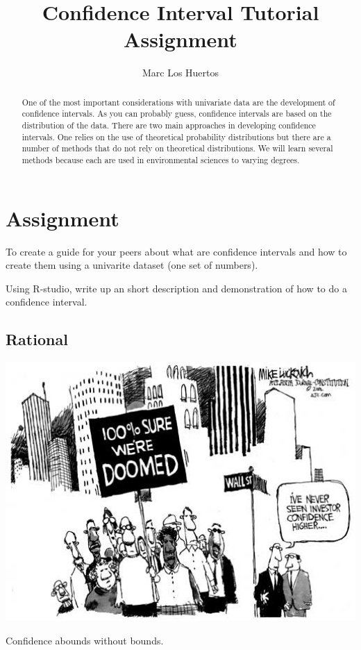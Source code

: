 \documentclass{tufte-handout}\usepackage[]{graphicx}\usepackage[]{color}
\title{Confidence Interval Tutorial Assignment %
}
\author[Marc Los Huertos]{Marc Los Huertos}
\begin{document}

\maketitle%
\begin{abstract}
\noindent One of the most important considerations with univariate data are the development of confidence intervals. As you can probably guess, confidence intervals are based on the distribution of the data. There are two main approaches in developing confidence intervals. One relies on the use of theoretical probability distributions but there are a number of methods that do not rely on theoretical distributions. We will learn several methods because each are used in environmental sciences to varying degrees.
\end{abstract}




\section{Assignment}

To create a guide for your peers about what are confidence intervals and how to create them using a univarite dataset (one set of numbers). 

Using R-studio, write up an short description and demonstration of how to do a confidence interval.

\subsection{Rational}

\begin{marginfigure}
	\centering
		\includegraphics[width=1.00\textwidth]{Investor_confidence500.jpg}
	\caption{Confidence abounds without bounds.}
	\label{fig:Investor_confidence500}
\end{marginfigure}
\end{document}
